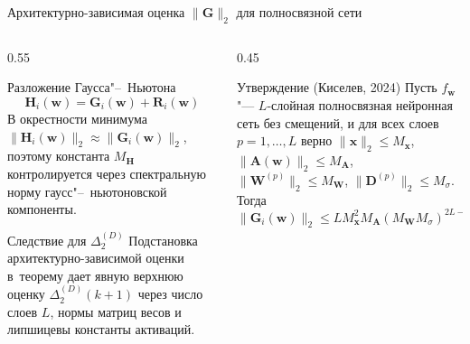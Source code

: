 \documentclass[aspectratio=169]{beamer}
\begin{document}
\begin{frame}{Архитектурно-зависимая оценка $\|\mathbf G\|_2$ для полносвязной сети}
\begin{columns}[T]
    \begin{column}{0.55\textwidth}
        \begin{block}{Разложение Гаусса"--~Ньютона}
            \vspace{-0.6em}
            \[
                \mathbf{H}_i(\mathbf w) = \mathbf G_i(\mathbf w) + \mathbf R_i(\mathbf w)
            \]
            В окрестности минимума $\|\mathbf H_i(\mathbf w)\|_2 \approx \|\mathbf G_i(\mathbf w)\|_2$, поэтому константа $M_{\mathbf H}$ контролируется через спектральную норму гаусс"--~ньютоновской компоненты.
        \end{block}
        \begin{block}{Следствие для $\Delta_2^{(D)}$}
            Подстановка архитектурно-зависимой оценки в~теорему дает явную верхнюю оценку $\Delta_2^{(D)}(k+1)$ через число слоев $L$, нормы матриц весов и липшицевы константы активаций.
        \end{block}
    \end{column}
    \begin{column}{0.45\textwidth}
        \begin{block}{Утверждение (Киселев, 2024)}
            Пусть $f_{\mathbf{w}}$ "--- $L$-слойная полносвязная нейронная сеть без смещений, и для всех слоев $p = 1, \ldots, L$ верно $\| \mathbf{x} \|_2 \leqslant M_{\mathbf{x}}$, $\| \mathbf{A}(\mathbf{w}) \|_2 \leqslant M_{\mathbf{A}}$, $\| \mathbf{W}^{(p)} \|_2 \leqslant M_{\mathbf{W}}$, $\| \mathbf{D}^{(p)} \|_2 \leqslant M_{\sigma}$. Тогда
            \[
                \| \mathbf{G}_i(\mathbf{w}) \|_2 \leqslant L M_{\mathbf{x}}^2 M_{\mathbf{A}} (M_{\mathbf{W}} M_{\sigma})^{2L - 2}.
            \]
        \end{block}
    \end{column}
\end{columns}
\end{frame}
\end{document}
